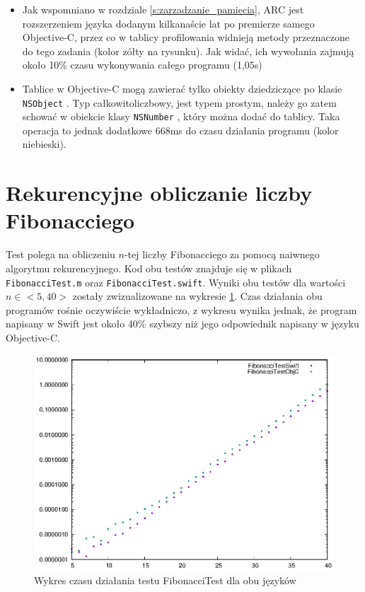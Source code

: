 \documentclass[mgr, shortabstract]{iithesis}
\newcommand{\objcinline}[1]{
    \texttt{#1}
}
\begin{document}
\begin{itemize}
    \item Jak wspomniano w rozdziale \ref{s:zarzadzanie_pamiecia}, ARC jest rozszerzeniem języka dodanym kilkanaście lat po premierze samego Objective-C, przez co w tablicy profilowania widnieją metody przeznaczone do tego zadania (kolor zółty na rysunku). Jak widać, ich wywołania zajmują około 10\% czasu wykonywania całego programu (1,05s)
    \item Tablice w Objective-C mogą zawierać tylko obiekty dziedziczące po klasie \objcinline{NSObject}. Typ całkowitoliczbowy, jest typem prostym, należy go zatem schować w obiekcie klasy \objcinline{NSNumber}, który można dodać do tablicy. Taka operacja to jednak dodatkowe 668ms do czasu działania programu (kolor niebieski).
\end{itemize}

\section{Rekurencyjne obliczanie liczby Fibonacciego}

Test polega na obliczeniu $n$-tej liczby Fibonacciego za pomocą naiwnego algorytmu rekurencyjnego. Kod obu testów znajduje się w plikach \texttt{FibonacciTest.m} oraz \texttt{FibonacciTest.swift}. Wyniki obu testów dla wartości $n \in <5, 40>$ zostały zwizualizowane na wykresie \ref{p:fibonacci}. Czas działania obu programów rośnie oczywiście wykładniczo, z wykresu wynika jednak, że program napisany w Swift jest około 40\% szybszy niż jego odpowiednik napisany w języku Objective-C.

\begin{figure}
    \includegraphics{plots/Fibonacci.eps}
    \caption{Wykres czasu działania testu FibonacciTest dla obu języków}
    \label{p:fibonacci}
\end{figure}
\end{document}
